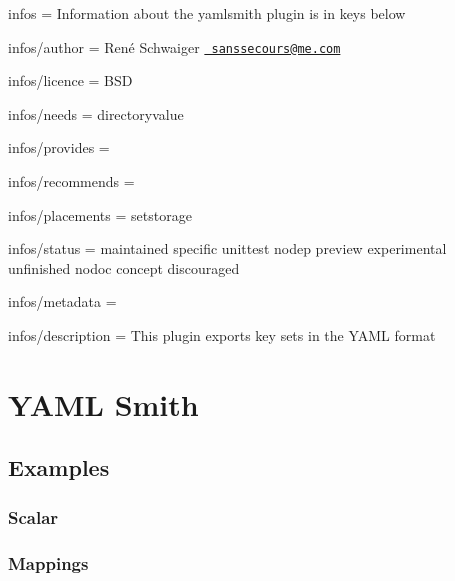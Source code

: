 
\begin{DoxyItemize}
\item infos = Information about the yamlsmith plugin is in keys below
\item infos/author = René Schwaiger \href{mailto:sanssecours@me.com}{\texttt{ sanssecours@me.\+com}}
\item infos/licence = B\+SD
\item infos/needs = directoryvalue
\item infos/provides =
\item infos/recommends =
\item infos/placements = setstorage
\item infos/status = maintained specific unittest nodep preview experimental unfinished nodoc concept discouraged
\item infos/metadata =
\item infos/description = This plugin exports key sets in the Y\+A\+ML format
\end{DoxyItemize}\hypertarget{autotoc_md853_src_plugins_yamlsmith_README_md}{}\section{Y\+A\+M\+L Smith}\label{autotoc_md853_src_plugins_yamlsmith_README_md}
\hypertarget{autotoc_md853_autotoc_md854}{}\subsection{Examples}\label{autotoc_md853_autotoc_md854}
\hypertarget{autotoc_md853_autotoc_md855}{}\subsubsection{Scalar}\label{autotoc_md853_autotoc_md855}

\begin{DoxyCode}{0}
\DoxyCodeLine{}
\DoxyCodeLine{}
\DoxyCodeLine{}
\end{DoxyCode}
\hypertarget{autotoc_md853_autotoc_md856}{}\subsubsection{Mappings}\label{autotoc_md853_autotoc_md856}

